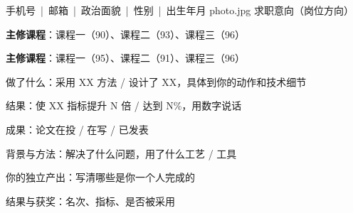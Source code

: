 \newcommand{\tighten}{%
  \linespread{1.0}\selectfont
  \setlist[itemize]{itemsep=0.0em,topsep=0.02em,parsep=0pt}%
  \setlength{\parskip}{0pt}%
}




%
  {手机号~|~邮箱~|~政治面貌~|~性别~|~出生年月}%
  {photo.jpg}%
  {求职意向（岗位方向）}


\begin{bullets}
  \item \textbf{主修课程}：课程一（90）、课程二（93）、课程三（96）
\end{bullets}

\begin{bullets}
  \item \textbf{主修课程}：课程一（95）、课程二（91）、课程三（96）
\end{bullets}


\begin{bullets}
  \item 做了什么：采用 XX 方法 / 设计了 XX，具体到你的动作和技术细节
  \item 结果：使 XX 指标提升 N 倍 / 达到 N\%，用数字说话
  \item 成果：论文在投 / 在写 / 已发表
\end{bullets}


\begin{bullets}
  \item 背景与方法：解决了什么问题，用了什么工艺 / 工具
  \item 你的独立产出：写清哪些是你一个人完成的
  \item 结果与获奖：名次、指标、是否被采用
\end{bullets}

